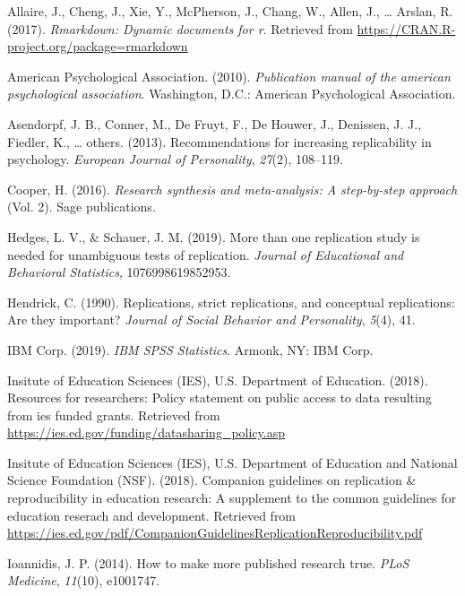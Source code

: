 \documentclass[
  english,
  ,man]{apa6}
\begin{document}
\leavevmode\hypertarget{ref-rmarkdown}{}%
Allaire, J., Cheng, J., Xie, Y., McPherson, J., Chang, W., Allen, J., \ldots{} Arslan, R. (2017). \emph{Rmarkdown: Dynamic documents for r}. Retrieved from \url{https://CRAN.R-project.org/package=rmarkdown}

\leavevmode\hypertarget{ref-apa}{}%
American Psychological Association. (2010). \emph{Publication manual of the american psychological association}. Washington, D.C.: American Psychological Association.

\leavevmode\hypertarget{ref-asendorpf2013}{}%
Asendorpf, J. B., Conner, M., De Fruyt, F., De Houwer, J., Denissen, J. J., Fiedler, K., \ldots{} others. (2013). Recommendations for increasing replicability in psychology. \emph{European Journal of Personality}, \emph{27}(2), 108--119.

\leavevmode\hypertarget{ref-cooper2016}{}%
Cooper, H. (2016). \emph{Research synthesis and meta-analysis: A step-by-step approach} (Vol. 2). Sage publications.

\leavevmode\hypertarget{ref-hedges2019}{}%
Hedges, L. V., \& Schauer, J. M. (2019). More than one replication study is needed for unambiguous tests of replication. \emph{Journal of Educational and Behavioral Statistics}, 1076998619852953.

\leavevmode\hypertarget{ref-hendrick1990}{}%
Hendrick, C. (1990). Replications, strict replications, and conceptual replications: Are they important? \emph{Journal of Social Behavior and Personality}, \emph{5}(4), 41.

\leavevmode\hypertarget{ref-spss}{}%
IBM Corp. (2019). \emph{IBM SPSS Statistics}. Armonk, NY: IBM Corp.

\leavevmode\hypertarget{ref-iesdata}{}%
Insitute of Education Sciences (IES), U.S. Department of Education. (2018). Resources for researchers: Policy statement on public access to data resulting from ies funded grants. Retrieved from \url{https://ies.ed.gov/funding/datasharing_policy.asp}

\leavevmode\hypertarget{ref-iesrepro}{}%
Insitute of Education Sciences (IES), U.S. Department of Education and National Science Foundation (NSF). (2018). Companion guidelines on replication \& reproducibility in education research: A supplement to the common guidelines for education reserach and development. Retrieved from \url{https://ies.ed.gov/pdf/CompanionGuidelinesReplicationReproducibility.pdf}

\leavevmode\hypertarget{ref-ioannidis2014}{}%
Ioannidis, J. P. (2014). How to make more published research true. \emph{PLoS Medicine}, \emph{11}(10), e1001747.
\end{document}
